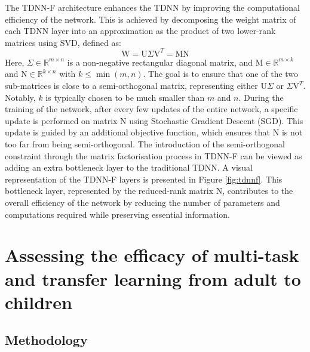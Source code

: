 The TDNN-F architecture \cite{TDNN-F} enhances the TDNN by improving the computational efficiency of the network. This is achieved by decomposing the weight matrix of each TDNN layer into an approximation as the product of two lower-rank matrices using SVD, defined as:
\begin{equation}
    \text{W} = \text{U}\Sigma \text{V}^T = \text{MN}
\end{equation}
Here, $\Sigma \in \mathbb{R}^{m \times n}$ is a non-negative rectangular diagonal matrix, and $\text{M} \in \mathbb{R}^{m \times k}$ and $\text{N} \in \mathbb{R}^{k \times n}$ with $k \leq \min(m,n)$. The goal is to ensure that one of the two sub-matrices is close to a semi-orthogonal matrix, representing either $\text{U}\Sigma$ or $\Sigma \text{V}^T$. Notably, $k$ is typically chosen to be much smaller than $m$ and $n$.
During the training of the network, after every few updates of the entire network, a specific update is performed on matrix $\text{N}$ using Stochastic Gradient Descent (SGD). This update is guided by an additional objective function, which ensures that $\text{N}$ is not too far from being semi-orthogonal.
The introduction of the semi-orthogonal constraint through the matrix factorisation process in TDNN-F can be viewed as adding an extra bottleneck layer to the traditional TDNN. A visual representation of the TDNN-F layers is presented in Figure \ref{fig:tdnnf}. This bottleneck layer, represented by the reduced-rank matrix $\text{N}$, contributes to the overall efficiency of the network by reducing the number of parameters and computations required while preserving essential information.


\section{Assessing the efficacy of multi-task and transfer learning from adult to children}
\label{section:HMMDNNADULT2CHILD}
\subsection{Methodology}

